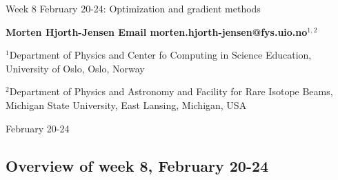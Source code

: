 \documentclass[%
oneside,                 %
final,                   %
10pt]{article}
\begin{document}

\newcommand{\exercisesection}[1]{\subsection*{#1}}






\thispagestyle{empty}

\begin{center}
{\LARGE\bf
\begin{spacing}{1.25}
Week 8 February 20-24: Optimization and gradient methods
\end{spacing}
}
\end{center}


\begin{center}
{\bf Morten Hjorth-Jensen  Email morten.hjorth-jensen@fys.uio.no${}^{1, 2}$} \\ [0mm]
\end{center}

\begin{center}
\centerline{{\small ${}^1$Department of Physics and Center fo Computing in Science Education, University of Oslo, Oslo, Norway}}
\centerline{{\small ${}^2$Department of Physics and Astronomy and Facility for Rare Isotope Beams, Michigan State University, East Lansing, Michigan, USA}}
\end{center}
    

\begin{center}
February 20-24
\end{center}

\vspace{1cm}



\subsection*{Overview of week 8, February 20-24}

\end{document}

